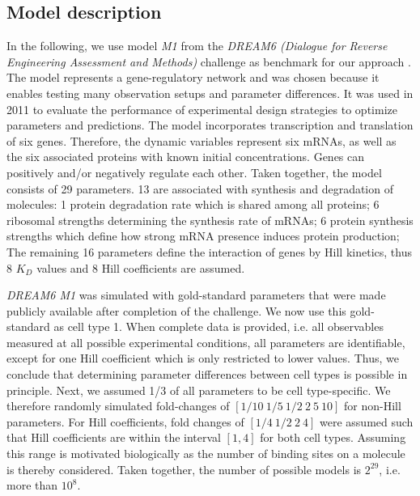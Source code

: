 \documentclass{bioinfo}
\begin{document}
\subsection{Model description}
In the following, we use model \emph{M1} from the \emph{DREAM6 (Dialogue for Reverse Engineering Assessment and Methods)} challenge as benchmark for our approach \citep{Steiert12}.
The model represents a gene-regulatory network and was chosen because it enables testing many observation setups and parameter differences.
It was used in 2011 to evaluate the performance of experimental design strategies to optimize parameters and predictions.
The model incorporates transcription and translation of six genes.
Therefore, the dynamic variables represent six mRNAs, as well as the six associated proteins with known initial concentrations.
Genes can positively and/or negatively regulate each other.
Taken together, the model consists of 29 parameters.
13 are associated with synthesis and degradation of molecules:
1 protein degradation rate which is shared among all proteins; 
6 ribosomal strengths determining the synthesis rate of mRNAs;
6 protein synthesis strengths which define how strong mRNA presence induces protein production;
The remaining 16 parameters define the interaction of genes by Hill kinetics, thus 8 $K_D$ values and 8 Hill coefficients are assumed.

\emph{DREAM6 M1} was simulated with gold-standard parameters that were made publicly available after completion of the challenge.
We now use this gold-standard as cell type 1.
When complete data is provided, i.e. all observables measured at all possible experimental conditions, all parameters are identifiable, except for one Hill coefficient which is only restricted to lower values.
Thus, we conclude that determining parameter differences between cell types is possible in principle.
Next, we assumed 1/3 of all parameters to be cell type-specific.
We therefore randomly simulated fold-changes of $[1/10~1/5~1/2~2~5~10]$ for non-Hill parameters.
For Hill coefficients, fold changes of $[1/4~1/2~2~4]$ were assumed such that Hill coefficients are within the interval $[1,4]$ for both cell types.
Assuming this range is motivated biologically as the number of binding sites on a molecule is thereby considered.
Taken together, the number of possible models is $2^{29}$, i.e. more than $10^8$.
\end{document}
